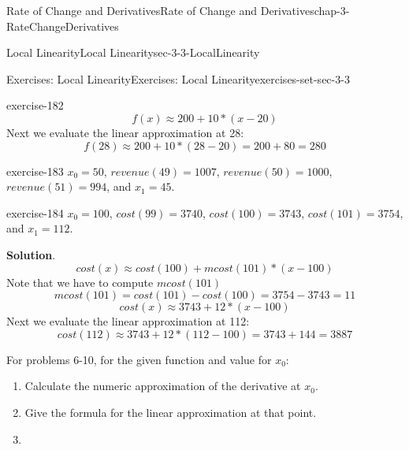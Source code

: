 \documentclass[oneside,10pt,]{book}
\numberwithin{equation}{section}
\begin{document}
\begin{chapterptx}{Rate of Change and Derivatives}{}{Rate of Change and Derivatives}{}{}{chap-3-RateChangeDerivatives}
\begin{sectionptx}{Local Linearity}{}{Local Linearity}{}{}{sec-3-3-LocalLinearity}
\begin{exercises-subsection-numberless}{Exercises: Local Linearity}{}{Exercises: Local Linearity}{}{}{exercises-set-sec-3-3}
\begin{exercisegroup}
\begin{divisionexerciseeg}{3}{}{}{exercise-182}
%
\begin{equation*}
f(x)\approx 200+10*(x-20)
\end{equation*}
\hypertarget{p-1171}{}%
Next we evaluate the linear approximation at 28:%
%
\begin{equation*}
f(28)\approx 200+10*(28-20)=200+80=280
\end{equation*}
\end{divisionexerciseeg}%
\begin{divisionexerciseeg}{4}{}{}{exercise-183}%
\hypertarget{p-1172}{}%
\(x_0=50\), \(revenue(49)=1007\), \(revenue(50)=1000\), \(revenue(51)=994\), and \(x_1=45\).%
\end{divisionexerciseeg}%
\begin{divisionexerciseeg}{5}{}{}{exercise-184}%
\hypertarget{p-1173}{}%
\(x_0=100\), \(cost(99)=3740\), \(cost(100)=3743\), \(cost(101)=3754\), and \(x_1=112\).%
\par\smallskip%
\noindent\textbf{Solution}.\hypertarget{solution-91}{}\quad%
%
\begin{equation*}
cost(x)\approx cost(100)+mcost(101)*(x-100)
\end{equation*}
\hypertarget{p-1174}{}%
Note that we have to compute \(mcost(101)\)%
%
\begin{equation*}
mcost(101)=cost(101)-cost(100)=3754-3743=11 
\end{equation*}
%
\begin{equation*}
cost(x)\approx3743+12*(x-100)
\end{equation*}
\hypertarget{p-1175}{}%
Next we evaluate the linear approximation at 112:%
%
\begin{equation*}
cost(112)\approx 3743+12*(112-100)=3743+144=3887
\end{equation*}
\end{divisionexerciseeg}%
\end{exercisegroup}
\par\medskip\noindent
\par\medskip\noindent%
\hypertarget{exercisegroup-19}{}%
\hypertarget{p-1176}{}%
For problems 6-10, for the given function and value for \(x_0\):%
\leavevmode%
\begin{enumerate}[label=(\alph*)]
\item\hypertarget{li-367}{}\hypertarget{p-1177}{}%
Calculate the numeric approximation of the derivative at \(x_0\).%
\item\hypertarget{li-368}{}\hypertarget{p-1178}{}%
Give the formula for the linear approximation at that point.%
\item\hypertarget{li-369}{}\hypertarget{p-1179}{}%

\end{enumerate}
\end{exercises-subsection-numberless}
\end{sectionptx}
\end{chapterptx}
\end{document}
